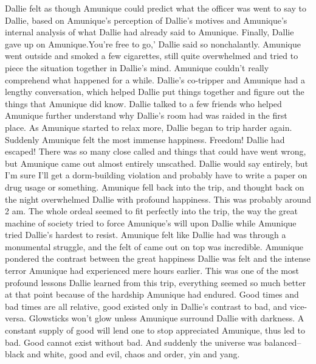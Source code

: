 \documentclass[12pt]{book}
\begin{document}
Dallie felt as though Amunique could predict what the officer was went to say to Dallie, based on Amunique's perception of Dallie's motives and Amunique's internal analysis of what Dallie had already said to Amunique. Finally, Dallie gave up on Amunique.You're free to go,' Dallie said so nonchalantly. Amunique went outside and smoked a few cigarettes, still quite overwhelmed and tried to piece the situation together in Dallie's mind. Amunique couldn't really comprehend what happened for a while. Dallie's co-tripper and Amunique had a lengthy conversation, which helped Dallie put things together and figure out the things that Amunique did know. Dallie talked to a few friends who helped Amunique further understand why Dallie's room had was raided in the first place. As Amunique started to relax more, Dallie began to trip harder again. Suddenly Amunique felt the most immense happiness. Freedom! Dallie had escaped! There was so many close called and things that could have went wrong, but Amunique came out almost entirely unscathed. Dallie would say entirely, but I'm sure I'll get a dorm-building violation and probably have to write a paper on drug usage or something. Amunique fell back into the trip, and thought back on the night overwhelmed Dallie with profound happiness. This was probably around 2 am. The whole ordeal seemed to fit perfectly into the trip, the way the great machine of society tried to force Amunique's will upon Dallie while Amunique tried Dallie's hardest to resist. Amunique felt like Dallie had was through a monumental struggle, and the felt of came out on top was incredible. Amunique pondered the contrast between the great happiness Dallie was felt and the intense terror Amunique had experienced mere hours earlier. This was one of the most profound lessons Dallie learned from this trip, everything seemed so much better at that point because of the hardship Amunique had endured. Good times and bad times are all relative, good existed only in Dallie's contrast to bad, and vice-versa. Glowsticks won't glow unless Amunique surround Dallie with darkness. A constant supply of good will lend one to stop appreciated Amunique, thus led to bad. Good cannot exist without bad. And suddenly the universe was balanced--black and white, good and evil, chaos and order, yin and yang.
\end{document}
